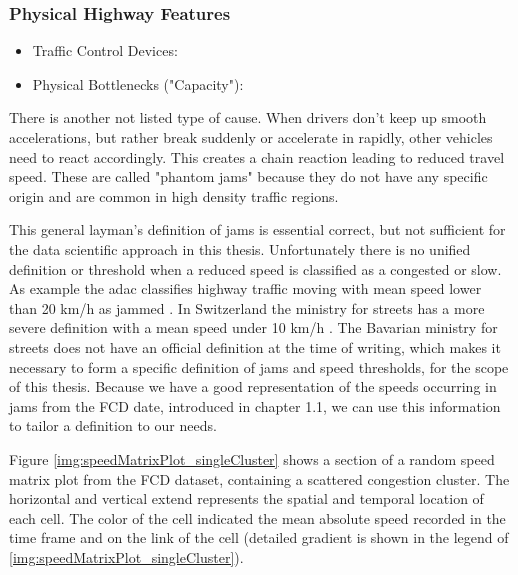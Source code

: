 \documentclass[a4paper,12pt]{report}
\begin{document}
\subsubsection{Physical Highway Features}

\begin{itemize}
	\item Traffic Control Devices:
	\item Physical Bottlenecks ("Capacity"):
\end{itemize}

\cite{FHA2011} %

\bigskip

There is another not listed type of cause. When drivers don't keep up smooth accelerations, but rather break suddenly or accelerate in rapidly, other vehicles need to react accordingly. This creates a chain reaction leading to reduced travel speed. These are called "phantom jams" because they do not have any specific origin and are common in high density traffic regions. \cite{ASTRA2020} 

This general layman's definition of jams is essential correct, but not sufficient for the data scientific approach in this thesis. Unfortunately there is no unified definition or threshold when a reduced speed is classified as a congested or slow. As example the \acrshort{adac} classifies highway traffic moving with mean speed lower than 20 km/h as jammed \cite{ADAC2019}. In Switzerland the ministry for streets has a more severe definition with a mean speed under 10 km/h \cite{ASTRA2020}. The Bavarian ministry for streets does not have an official definition at the time of writing, which makes it necessary to form a specific definition of \glspl{jam} and speed thresholds, for the scope of this thesis. Because we have a good representation of the speeds occurring in jams from the FCD date, introduced in chapter 1.1, we can use this information to tailor a definition to our needs. 

Figure \ref{img:speedMatrixPlot_singleCluster} shows a section of a random speed matrix plot from the FCD dataset, containing a scattered congestion cluster. The horizontal and vertical extend represents the spatial and temporal location of each cell. The color of the cell indicated the mean absolute speed recorded in the time frame and on the link of the cell (detailed gradient is shown in the legend of \ref{img:speedMatrixPlot_singleCluster}).
\end{document}
